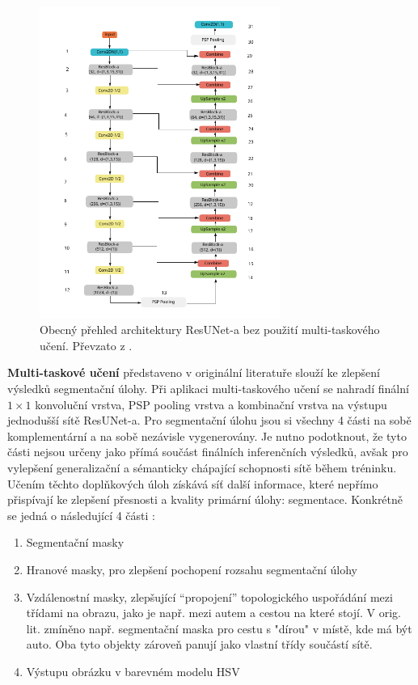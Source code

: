 \begin{figure}[H]
\centering
\includegraphics[width=0.7\textwidth,keepaspectratio]{Figures/resuneta_overview.pdf}
\caption[Obecný přehled architektury ResUNet-a]{Obecný přehled architektury ResUNet-a bez použití multi-taskového učení. Převzato z \cite{resuneta}. }
\label{fig:resuneta_overview}
\end{figure}

\textbf{Multi-taskové učení} představeno v originální literatuře slouží ke zlepšení výsledků segmentační úlohy. Při aplikaci multi-taskového učení se nahradí finální $1\times1$ konvoluční vrstva, PSP pooling vrstva a kombinační vrstva na výstupu jednodušší sítě ResUNet-a. Pro segmentační úlohu jsou si všechny 4 části na sobě komplementární a na sobě nezávisle vygenerovány. Je nutno podotknout, že tyto části nejsou určeny jako přímá součást finálních inferenčních výsledků, avšak pro vylepšení generalizační a sémanticky chápající schopnosti sítě během tréninku. Učením těchto doplňkových úloh získává síť další informace, které nepřímo přispívají ke zlepšení přesnosti a kvality primární úlohy: segmentace. Konkrétně se jedná o následující 4 části \cite{resuneta}: 
\begin{enumerate}
    \item Segmentační masky
    \item Hranové masky, pro zlepšení pochopení rozsahu segmentační úlohy
    \item Vzdálenostní masky, zlepšující \enquote{propojení} topologického uspořádání mezi třídami na obrazu, jako je např. mezi autem a cestou na které stojí. V orig. lit. zmíněno např. segmentační maska pro cestu s "dírou" v místě, kde má být auto. Oba tyto objekty zároveň panují jako vlastní třídy součástí sítě.
    \item Výstupu obrázku v barevném modelu HSV
\end{enumerate}
\endinput